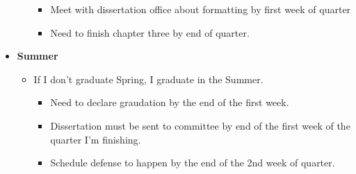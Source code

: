 \documentclass{article}
\begin{document}
\begin{itemize}
\begin{itemize}
        \begin{itemize}
          \item Meet with dissertation office about formatting by first week of quarter
          \item Need to finish chapter three by end of quarter.
        \end{itemize}
    \end{itemize}
  \item \textbf{Summer}
    \begin{itemize}
      \item If I don't graduate Spring, I graduate in the Summer.
        \begin{itemize}
          \item Need to declare graudation by the end of the first week.
          \item Dissertation must be sent to committee by end of the first week of the quarter I'm finishing.
          \item Schedule defense to happen by the end of the 2nd week of quarter.
        \end{itemize}
    \end{itemize}
\end{itemize}
\end{document}
